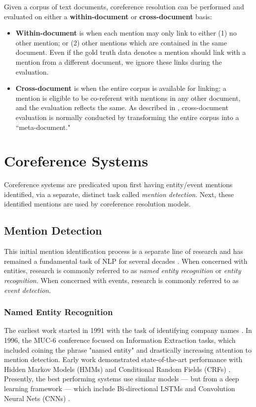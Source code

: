 Given a corpus of text documents, coreference resolution can be performed and evaluated on either a \textbf{within-document} or \textbf{cross-document} basis:

\begin{itemize}
\item \textbf{Within-document} is when each mention may only link to either (1) no other mention; or (2) other mentions which are contained in the same document.  Even if the gold truth data denotes a mention should link with a mention from a different document, we ignore these links during the evaluation.
\item \textbf{Cross-document} is when the entire corpus is available for linking; a mention is eligible to be co-referent with mentions in any other document, and the evaluation reflects the same.  As described in \cite{revisit:16}, cross-document evaluation is normally conducted by transforming the entire corpus into a ``meta-document."
\end{itemize}

\section{Coreference Systems}
Coreference systems are predicated upon first having entity/event mentions identified, via a separate, distinct task called \textit{mention detection}.  Next, these identified mentions are used by coreference resolution models.

\subsection{Mention Detection}
This initial mention identification process is a separate line of research and has remained a fundamental task of NLP for several decades \cite{ner-sekine2007}.  When concerned with entities, research is commonly referred to as \textit{named entity recognition} or \textit{entity recognition}. When concerned with events, research is commonly referred to as \textit{event detection}.

\subsubsection{Named Entity Recognition}
The earliest work started in 1991 with the task of identifying company names \cite{Rau91}.  In 1996, the MUC-6 conference \cite{Grishman:1996:MUC:992628.992709} focused on Information Extraction tasks, which included coining the phrase "named entity" and drastically increasing attention to mention detection.  Early work demonstrated state-of-the-art performance with Hidden Markov Models (HMMs) \cite{Bikel97nymble:a} and Conditional Random Fields (CRFs) \cite{McCallum:2003:ERN:1119176.1119206}.  Presently, the best performing systems use similar models --- but from a deep learning framework --- which include Bi-directional LSTMs \cite{Hochreiter:1997:LSM:1246443.1246450, DBLP:journals/tacl/ChiuN16} and Convolution Neural Nets (CNNs) \cite{ma-hovy:2016:P16-1}.

